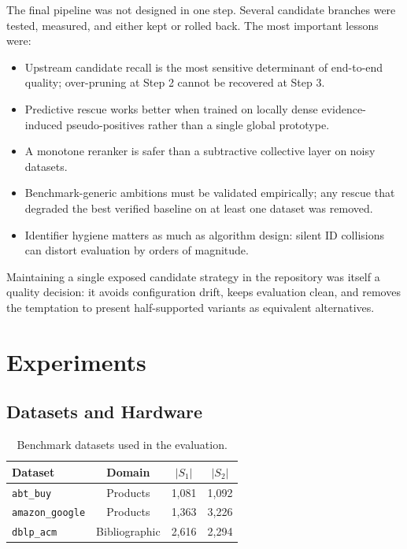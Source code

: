 \documentclass[10pt,twocolumn]{article}
\begin{document}
The final pipeline was not designed in one step. Several candidate branches
were tested, measured, and either kept or rolled back. The most important
lessons were:
\begin{itemize}
  \item Upstream candidate recall is the most sensitive determinant of
    end-to-end quality; over-pruning at Step 2 cannot be recovered at
    Step 3.
  \item Predictive rescue works better when trained on locally dense
    evidence-induced pseudo-positives rather than a single global prototype.
  \item A monotone reranker is safer than a subtractive collective layer on
    noisy datasets.
  \item Benchmark-generic ambitions must be validated empirically; any rescue
    that degraded the best verified baseline on at least one dataset was removed.
  \item Identifier hygiene matters as much as algorithm design: silent ID
    collisions can distort evaluation by orders of magnitude.
\end{itemize}

Maintaining a single exposed candidate strategy in the repository was itself
a quality decision: it avoids configuration drift, keeps evaluation clean,
and removes the temptation to present half-supported variants as equivalent
alternatives.

\section{Experiments}

\subsection{Datasets and Hardware}

\begin{table}[t]
\centering
\caption{Benchmark datasets used in the evaluation.}
\label{tab:datasets}
\small
\begin{tabular}{lccc}
\toprule
Dataset & Domain & $|S_1|$ & $|S_2|$ \\
\midrule
\texttt{abt\_buy}      & Products       & 1,081 & 1,092 \\
\texttt{amazon\_google}& Products       & 1,363 & 3,226 \\
\texttt{dblp\_acm}     & Bibliographic  & 2,616 & 2,294 \\
\bottomrule
\end{tabular}
\end{table}
\end{document}
